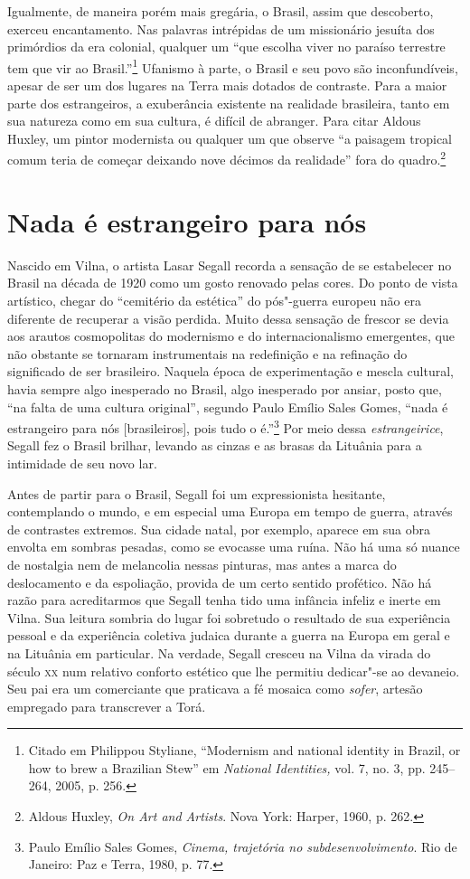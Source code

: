 Igualmente, de maneira porém mais gregária, o Brasil, assim que
descoberto, exerceu encantamento. Nas palavras intrépidas de um
missionário jesuíta dos primórdios da era colonial, qualquer um ``que
escolha viver no paraíso terrestre tem que vir ao Brasil.''\footnote{Citado
  em Philippou Styliane, ``Modernism and national identity in Brazil, or
  how to brew a Brazilian Stew'' em \textit{National Identities,} vol. 7,
  no. 3, pp. 245--264, 2005, p. 256.} Ufanismo à parte, o Brasil e seu
povo são inconfundíveis, apesar de ser um dos
lugares na Terra mais dotados de contraste. Para a maior parte dos
estrangeiros, a exuberância existente na realidade brasileira, tanto em
sua natureza como em sua cultura, é difícil de abranger. Para citar
Aldous Huxley, um pintor modernista ou qualquer um que observe ``a
paisagem tropical comum teria de começar deixando nove décimos da
realidade'' fora do quadro.\footnote{Aldous Huxley, \textit{On Art and
  Artists}. Nova York: Harper, 1960, p. 262.} 

\section*{Nada é estrangeiro para nós}

Nascido em Vilna, o artista
Lasar Segall recorda a sensação de se estabelecer no Brasil na década de
1920 como um gosto renovado pelas cores. Do ponto de vista artístico,
chegar do ``cemitério da estética'' do pós"-guerra europeu não era
diferente de recuperar a visão perdida. Muito dessa sensação de frescor
se devia aos arautos cosmopolitas do modernismo e do internacionalismo
emergentes, que não obstante se tornaram instrumentais na redefinição e
na refinação do significado de ser brasileiro. Naquela época de
experimentação e mescla cultural, havia sempre algo inesperado no
Brasil, algo inesperado por ansiar, posto que, ``na falta de uma cultura
original'', segundo Paulo Emílio Sales Gomes, ``nada é estrangeiro para
nós {[}brasileiros{]}, pois tudo o é.''\footnote{Paulo Emílio
Sales Gomes, \textit{Cinema, trajetória no subdesenvolvimento}. Rio de
Janeiro: Paz e Terra, 1980, p. 77.} Por meio dessa \textit{estrangeirice},
Segall fez o Brasil brilhar, levando as cinzas e as brasas da Lituânia
para a intimidade de seu novo lar.

Antes de partir para o Brasil, Segall foi um expressionista hesitante,
contemplando o mundo, e em especial uma Europa em tempo de guerra,
através de contrastes extremos. Sua cidade natal, por exemplo, aparece
em sua obra envolta em sombras pesadas, como se evocasse uma ruína. Não
há uma só nuance de nostalgia nem de melancolia nessas pinturas, mas
antes a marca do deslocamento e da espoliação, provida de um certo
sentido profético. Não há razão para acreditarmos que Segall tenha tido
uma infância infeliz e inerte em Vilna. Sua leitura sombria do lugar foi
sobretudo o resultado de sua experiência pessoal e da experiência
coletiva judaica durante a guerra na Europa em geral e na Lituânia em
particular. Na verdade, Segall cresceu na Vilna da virada do século \textsc{xx}
num relativo conforto estético que lhe permitiu dedicar"-se ao devaneio.
Seu pai era um comerciante que praticava a fé mosaica como \textit{sofer},
artesão empregado para transcrever a Torá. 

